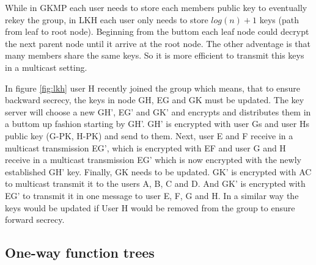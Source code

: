 While in GKMP each user needs to store each members public key to eventually rekey the group, in LKH each user only needs to store $log(n) +1$ keys (path from leaf to root node). Beginning from the buttom each leaf node could decrypt the next parent node until it arrive at the root node. The other adventage is that many members share the same keys. So it is more efficient to transmit this keys in a multicast setting.  

In figure \ref{fig:lkh} user H recently joined the group which means, that to ensure backward secrecy, the keys in node GH, EG and GK must be updated. The key server will choose a new GH', EG' and GK' and encrypts and distributes them in a buttom up fashion starting by GH'. GH' is encrypted with user Gs and user Hs public key (G-PK, H-PK) and send to them. Next, user E and F receive in a multicast transmission EG', which is encrypted with EF and user G and H receive in a multicast transmission EG' which is now encrypted with the newly established GH' key. Finally, GK needs to be updated. GK' is encrypted with AC to multicast transmit it to the users A, B, C and D. And GK' is encrypted with EG' to transmit it in one message to user E, F, G and H. In a similar way the keys would be updated if User H would be removed from the group to ensure forward secrecy.   


\subsection{One-way function trees}  

